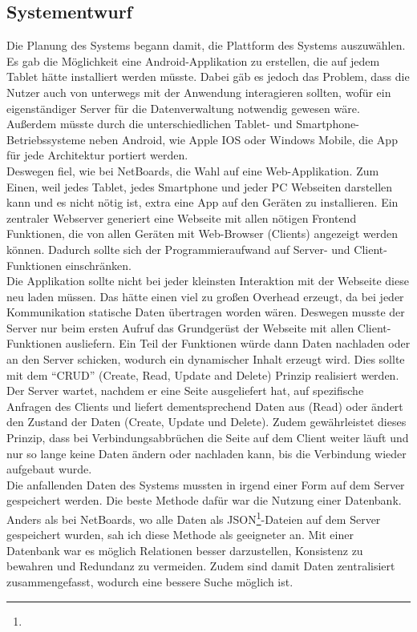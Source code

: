 \subsection{Systementwurf}\label{Systementwurf}
Die Planung des Systems begann damit, die Plattform des Systems auszuwählen.
Es gab die Möglichkeit eine Android-Applikation zu erstellen, die auf jedem Tablet hätte installiert werden müsste.
Dabei gäb es jedoch das Problem, dass die Nutzer auch von unterwegs mit der Anwendung interagieren sollten, wofür ein eigenständiger Server für die Datenverwaltung notwendig gewesen wäre.
Außerdem müsste durch die unterschiedlichen Tablet- und Smartphone-Betriebssysteme neben Android, wie Apple IOS oder Windows Mobile, die App für jede Architektur portiert werden.
\\
Deswegen fiel, wie bei NetBoards, die Wahl auf eine Web-Applikation. Zum Einen, weil jedes Tablet, jedes Smartphone und jeder PC Webseiten darstellen kann und es nicht nötig ist, extra eine App auf den Geräten zu installieren.
Ein zentraler Webserver generiert eine Webseite mit allen nötigen Frontend Funktionen, die von allen Geräten mit Web-Browser (Clients) angezeigt werden können. Dadurch sollte sich der Programmieraufwand auf Server- und Client-Funktionen einschränken.
\\
Die Applikation sollte nicht bei jeder kleinsten Interaktion mit der Webseite diese neu laden müssen. Das hätte einen viel zu großen Overhead erzeugt, da bei jeder Kommunikation statische Daten übertragen worden wären.
Deswegen musste der Server nur beim ersten Aufruf das Grundgerüst der Webseite mit allen Client-Funktionen ausliefern. Ein Teil der Funktionen würde dann Daten nachladen oder an den Server schicken, wodurch ein dynamischer Inhalt erzeugt wird.
Dies sollte mit dem ``CRUD'' (Create, Read, Update and Delete) Prinzip realisiert werden.
Der Server wartet, nachdem er eine Seite ausgeliefert hat, auf spezifische Anfragen des Clients und liefert dementsprechend Daten aus (Read) oder ändert den Zustand der Daten (Create, Update und Delete). Zudem gewährleistet dieses Prinzip, dass bei Verbindungsabbrüchen die Seite auf dem Client weiter läuft und nur so lange keine Daten ändern oder nachladen kann, bis die Verbindung wieder aufgebaut wurde.
\\
Die anfallenden Daten des Systems mussten in irgend einer Form auf dem Server gespeichert werden. Die beste Methode dafür war die Nutzung einer Datenbank. Anders als bei NetBoards, wo alle Daten als JSON\footnote{}-Dateien auf dem Server gespeichert wurden, sah ich diese Methode als geeigneter an. Mit einer Datenbank war es möglich Relationen besser darzustellen, Konsistenz zu bewahren und Redundanz zu vermeiden. Zudem sind damit Daten zentralisiert zusammengefasst, wodurch eine bessere Suche möglich ist.
